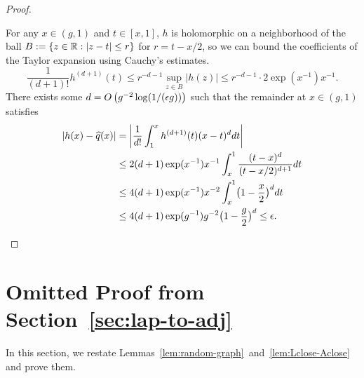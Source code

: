 \begin{proof}
\begin{enumerate}
For any $x \in (g, 1)$ and $t \in [x, 1]$, $h$ is holomorphic on a neighborhood of the ball $B := \{z \in \mathbb{R} : |z - t| \le r \}$ for $r = t - x/2$, so we can bound the coefficients of the Taylor expansion using Cauchy's estimates.
\[
\frac{1}{(d+1)!} h^{(d+1)}(t) \le r^{-d-1} \sup_{z \in B} |h(z)| \le r^{-d-1} \cdot 2 \exp(x^{-1}) x^{-1}.
\]
There exists some $d = O\left(g^{-2} \log(1/(\epsilon g))\right)$ such that the remainder at $x \in (g, 1)$ satisfies
\begin{align*}
\left| h(x) - \hat q(x) \right|
  & = \left| \frac{1}{d!} \int_1^{x} h^{(d+1)}(t) (x-t)^d dt \right| \\
  & \le 2(d+1) \exp(x^{-1}) x^{-1} \int_x^1 \frac{(t-x)^d}{(t-x/2)^{d+1}} dt \\
  & \le 4(d+1) \exp(x^{-1}) x^{-2} \int_x^1 \bigl(1-\frac{x}{2}\bigr)^d dt \\
  & \le 4(d+1) \exp(g^{-1}) g^{-2} \bigl(1-\frac{g}{2}\bigr)^d \le \eps. \tag*{\jmlrQED} %
\end{align*}
\end{enumerate}
\renewcommand{\jmlrQED}{}
\end{proof}



\section{Omitted Proof from Section~\ref{sec:lap-to-adj}}
\label{apx:lap-to-adj}

In this section, we restate Lemmas~\ref{lem:random-graph}~and~\ref{lem:Lclose-Aclose} and prove them.

